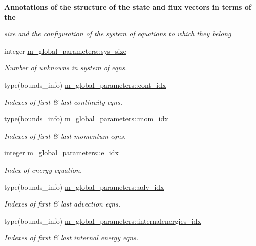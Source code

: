 \begin{Indent}\textbf{ Annotations of the structure of the state and flux vectors in terms of the}\par
{\em size and the configuration of the system of equations to which they belong }\begin{DoxyCompactItemize}
\item 
integer \hyperlink{namespacem__global__parameters_a4dac2e4ead915635e0c6c33af87be01b}{m\+\_\+global\+\_\+parameters\+::sys\+\_\+size}
\begin{DoxyCompactList}\small\item\em Number of unknowns in system of eqns. \end{DoxyCompactList}\item 
type(bounds\+\_\+info) \hyperlink{namespacem__global__parameters_adefe3b78bf286d73a56aef49880dfb0d}{m\+\_\+global\+\_\+parameters\+::cont\+\_\+idx}
\begin{DoxyCompactList}\small\item\em Indexes of first \& last continuity eqns. \end{DoxyCompactList}\item 
type(bounds\+\_\+info) \hyperlink{namespacem__global__parameters_ad138d35528cf27ff42dba00d13c269be}{m\+\_\+global\+\_\+parameters\+::mom\+\_\+idx}
\begin{DoxyCompactList}\small\item\em Indexes of first \& last momentum eqns. \end{DoxyCompactList}\item 
integer \hyperlink{namespacem__global__parameters_ac6ef72ca6aa7a22e60c864df25559892}{m\+\_\+global\+\_\+parameters\+::e\+\_\+idx}
\begin{DoxyCompactList}\small\item\em Index of energy equation. \end{DoxyCompactList}\item 
type(bounds\+\_\+info) \hyperlink{namespacem__global__parameters_ae8e6c40b6ec73cb126b0cce7496e0057}{m\+\_\+global\+\_\+parameters\+::adv\+\_\+idx}
\begin{DoxyCompactList}\small\item\em Indexes of first \& last advection eqns. \end{DoxyCompactList}\item 
type(bounds\+\_\+info) \hyperlink{namespacem__global__parameters_aac5ed9f316eeebbe04258bb1120cbea4}{m\+\_\+global\+\_\+parameters\+::internalenergies\+\_\+idx}
\begin{DoxyCompactList}\small\item\em Indexes of first \& last internal energy eqns. \end{DoxyCompactList}\item 

\end{DoxyCompactItemize}
\end{Indent}
